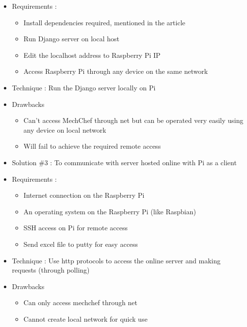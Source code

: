 {\begin{itemize}
    \item Requirements :  
    \begin{itemize}
    \renewcommand{\labelitemi}{$\Rightarrow$}
    \item Install dependencies required, mentioned in the article
    \item Run Django server on local host
    \item Edit the localhost address to Raspberry Pi IP 
    \item Access Raspberry Pi through any device on the same network
    \end{itemize}
    
    \item Technique : Run the Django server locally on Pi
    \item Drawbacks
    \begin{itemize}
    \renewcommand{\labelitemi}{$\Rightarrow$}
    \item Can’t access MechChef through net but can be operated very easily using any device on local network 
    \item Will fail to achieve the required remote access
    \end{itemize}
    
    \item Solution \#3 : To communicate with server hosted online with Pi as a client 

    \item Requirements :  
    \begin{itemize}
    \renewcommand{\labelitemi}{$\Rightarrow$}
    \item Internet connection on the Raspberry Pi
    \item An operating system on the Raspberry Pi (like Raspbian)
    \item SSH access on Pi for remote access
    \item Send excel file to putty for easy access 
    \end{itemize}
    
    \item Technique : Use http protocols to access the online server and making requests (through polling)
    \item Drawbacks
    \begin{itemize}
    \renewcommand{\labelitemi}{$\Rightarrow$}
    \item Can only access mechchef through net
    \item Cannot create local network for quick use

    \end{itemize}
    
\end{itemize}
}
